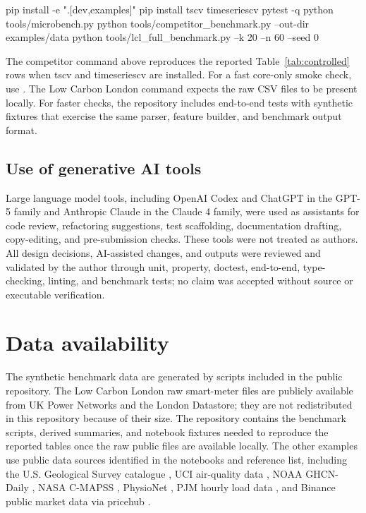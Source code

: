 \documentclass[10pt]{article}
\newcommand{\pkg}[1]{\textsf{#1}}
\DeclareRobustCommand{\code}[1]{\texttt{\detokenize{#1}}}
\begin{document}
\begin{Code}
pip install -e ".[dev,examples]"
pip install tscv timeseriescv
pytest -q
python tools/microbench.py
python tools/competitor_benchmark.py --out-dir examples/data
python tools/lcl_full_benchmark.py --k 20 --n 60 --seed 0
\end{Code}

The competitor command above reproduces the reported Table~\ref{tab:controlled}
rows when \pkg{tscv} and \pkg{timeseriescv} are installed. For a fast core-only
smoke check, use \code{--core-only}. The Low Carbon London command expects the
raw CSV files to be present locally. For faster checks, the repository includes
end-to-end tests with synthetic fixtures that exercise the same parser, feature
builder, and benchmark output format.

\subsection{Use of generative AI tools}

Large language model tools, including OpenAI Codex and ChatGPT in the GPT-5
family and Anthropic Claude in the Claude 4 family, were used as assistants for
code review, refactoring suggestions, test scaffolding, documentation drafting,
copy-editing, and pre-submission checks. These tools were not treated as
authors. All design decisions, AI-assisted changes, and outputs were reviewed
and validated by the author through unit, property, doctest, end-to-end,
type-checking, linting, and benchmark tests; no claim was accepted without
source or executable verification.

\section*{Data availability}

The synthetic benchmark data are generated by scripts included in the public
repository. The Low Carbon London raw smart-meter files are publicly available
from UK Power Networks and the London Datastore; they are not redistributed in
this repository because of their size. The repository contains the benchmark
scripts, derived summaries, and notebook fixtures needed to reproduce the
reported tables once the raw public files are available locally. The other
examples use public data sources identified in the notebooks and reference
list, including the U.S. Geological Survey catalogue \citep{usgs_catalog}, UCI
air-quality data \citep{devito2008airquality}, NOAA GHCN-Daily
\citep{noaa_ghcnd}, NASA C-MAPSS \citep{nasa_cmapss}, PhysioNet
\citep{physionet2012goldberger,physionet2012silva}, PJM hourly load data
\citep{pjm_load}, and Binance public market data via \pkg{pricehub}
\citep{binance_pricehub}.
\end{document}
